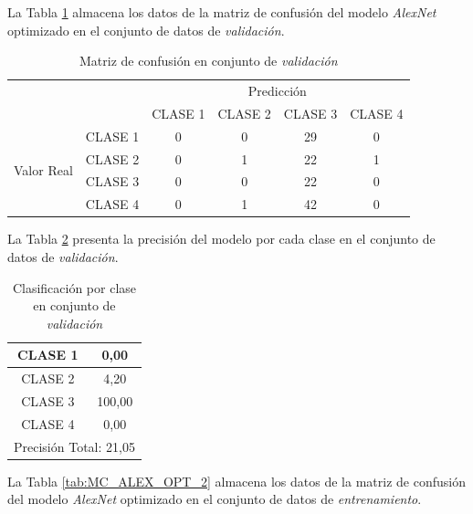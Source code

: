 \newpage
La Tabla \ref{tab:MC_ALEX_OPT} almacena los datos de la matriz de confusión del modelo \textit{AlexNet} optimizado en el conjunto de datos de \textit{validación}.

\begin{table}[htbp]
	\centering
	\resizebox{10cm}{!} {
	\begin{tabular}{|c|l|c|c|c|c|}
		\hline
		\multicolumn{2}{|c|}{\multirow{2}[4]{*}{}} & \multicolumn{4}{c|}{Predicción} \bigstrut\\
		\cline{3-6}    \multicolumn{2}{|c|}{} & CLASE 1 & CLASE 2 & CLASE 3 & CLASE 4 \bigstrut\\
		\hline
		\multirow{4}[8]{*}{\begin{sideways}Valor Real\end{sideways}} & CLASE 1 & 0     & 0     & 29    & 0 \bigstrut\\
		\cline{2-6}          & CLASE 2 & 0     & 1     & 22    & 1 \bigstrut\\
		\cline{2-6}          & CLASE 3 & 0     & 0     & 22    & 0 \bigstrut\\
		\cline{2-6}          & CLASE 4 & 0     & 1     & 42    & 0 \bigstrut\\
		\hline
	\end{tabular}
	}
	\caption{Matriz de confusión en conjunto de \textit{validación}}
	\label{tab:MC_ALEX_OPT}%
\end{table}%

La Tabla \ref{tab:Alexoptclases} presenta la precisión del modelo por cada clase en el conjunto de datos de \textit{validación}.


\begin{table}[htbp]
	\centering
	\begin{tabular}{|c|c|}
		\hline
		CLASE 1 & 0,00 \bigstrut\\
		\hline
		CLASE 2 & 4,20 \bigstrut\\
		\hline
		CLASE 3 & 100,00 \bigstrut\\
		\hline
		CLASE 4 & 0,00 \bigstrut\\
		\hline
		\multicolumn{2}{|c|}{Precisión Total: 21,05} \bigstrut\\
		\hline
	\end{tabular}%
	\caption{Clasificación por clase en conjunto de \textit{validación}
	}
	\label{tab:Alexoptclases}%
\end{table}%

La Tabla \ref{tab:MC_ALEX_OPT_2} almacena los datos de la matriz de confusión del modelo \textit{AlexNet} optimizado en el conjunto de datos de \textit{entrenamiento}.

